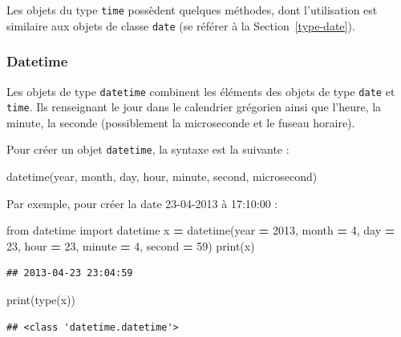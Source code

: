 \documentclass[12pt,]{book}
\newenvironment{Shaded}{\begin{snugshade}}{\end{snugshade}}
\newcommand{\DecValTok}[1]{\textcolor[rgb]{0.00,0.00,0.81}{#1}}
\newcommand{\ImportTok}[1]{#1}
\newcommand{\OperatorTok}[1]{\textcolor[rgb]{0.81,0.36,0.00}{\textbf{#1}}}
\newcommand{\BuiltInTok}[1]{#1}
\newcommand{\NormalTok}[1]{#1}
\numberwithin{equation}{section}
\numberwithin{countremarque}{section}
\begin{document}
Les objets du type \texttt{time} possèdent quelques méthodes, dont
l'utilisation est similaire aux objets de classe \texttt{date} (se
référer à la Section~\ref{type-date}).

\subsubsection{Datetime}\label{datetime}

Les objets de type \texttt{datetime} combinent les éléments des objets
de type \texttt{date} et \texttt{time}. Ils renseignant le jour dans le
calendrier grégorien ainsi que l'heure, la minute, la seconde
(possiblement la microseconde et le fuseau horaire).

Pour créer un objet \texttt{datetime}, la syntaxe est la suivante :

\begin{Shaded}
\begin{Highlighting}[]
\NormalTok{datetime(year, month, day, hour, minute, second, microsecond)}
\end{Highlighting}
\end{Shaded}

Par exemple, pour créer la date 23-04-2013 à 17:10:00 :

\begin{Shaded}
\begin{Highlighting}[]
\ImportTok{from}\NormalTok{ datetime }\ImportTok{import}\NormalTok{ datetime}
\NormalTok{x }\OperatorTok{=}\NormalTok{ datetime(year }\OperatorTok{=} \DecValTok{2013}\NormalTok{, month }\OperatorTok{=} \DecValTok{4}\NormalTok{, day }\OperatorTok{=} \DecValTok{23}\NormalTok{,}
\NormalTok{  hour }\OperatorTok{=} \DecValTok{23}\NormalTok{, minute }\OperatorTok{=} \DecValTok{4}\NormalTok{, second }\OperatorTok{=} \DecValTok{59}\NormalTok{)}
\BuiltInTok{print}\NormalTok{(x)}
\end{Highlighting}
\end{Shaded}

\begin{lstlisting}
## 2013-04-23 23:04:59
\end{lstlisting}

\begin{Shaded}
\begin{Highlighting}[]
\BuiltInTok{print}\NormalTok{(}\BuiltInTok{type}\NormalTok{(x))}
\end{Highlighting}
\end{Shaded}

\begin{lstlisting}
## <class 'datetime.datetime'>
\end{lstlisting}
\end{document}
